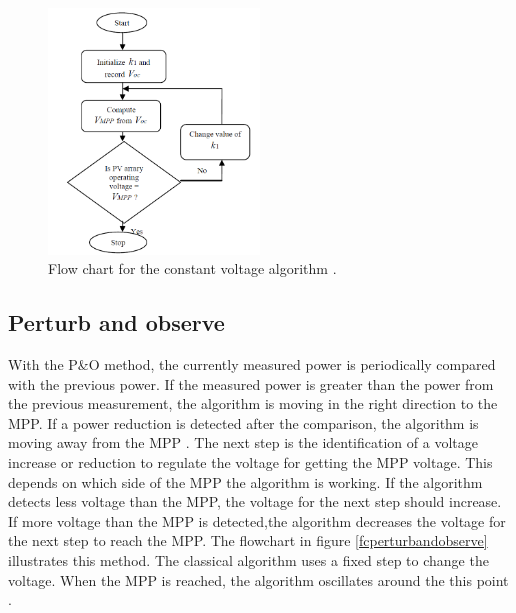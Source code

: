 \begin{figure}[H]
	\begin{center}
		\includegraphics[width=0.5\textwidth]{../Pictures/P1/Flow_chart/Flow_chart_constant_voltage}
		\caption{Flow chart for the constant voltage algorithm \cite{flowchartVC}. }
		\label{fcconstantvoltage}
	\end{center}	
\end{figure}


\subsection{Perturb and observe}
With the P\&O method, the currently measured power is periodically compared with the previous power. If the measured power is greater than the power from the previous measurement, the algorithm is moving in the right direction to the MPP. If a power reduction is detected after the comparison, the algorithm is moving away from the MPP . The next step is the identification of a voltage increase or reduction to regulate the voltage for getting the MPP voltage. This depends on which side of the MPP the algorithm is working. If the algorithm detects less voltage than the MPP, the voltage for the next step should increase. If more voltage than the MPP is detected,the algorithm decreases the voltage for the next step to reach the MPP.
The flowchart in figure \ref{fcperturbandobserve} illustrates this method. The classical algorithm uses a fixed step to change the voltage. When the MPP is reached, the algorithm oscillates around the this point \cite{flowchartVC}. 

